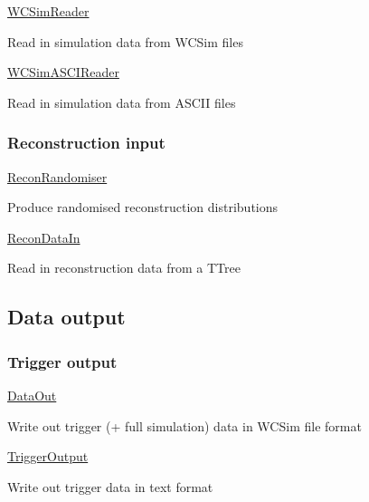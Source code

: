 \begin{DoxyItemize}
\item \hyperlink{classWCSimReader}{W\-C\-Sim\-Reader}
\begin{DoxyItemize}
\item Read in simulation data from W\-C\-Sim files
\end{DoxyItemize}
\item \hyperlink{classWCSimASCIReader}{W\-C\-Sim\-A\-S\-C\-I\-Reader}
\begin{DoxyItemize}
\item Read in simulation data from A\-S\-C\-I\-I files
\end{DoxyItemize}
\end{DoxyItemize}

\subsubsection*{Reconstruction input}


\begin{DoxyItemize}
\item \hyperlink{classReconRandomiser}{Recon\-Randomiser}
\begin{DoxyItemize}
\item Produce randomised reconstruction distributions
\end{DoxyItemize}
\item \hyperlink{classReconDataIn}{Recon\-Data\-In}
\begin{DoxyItemize}
\item Read in reconstruction data from a {\ttfamily T\-Tree}
\end{DoxyItemize}
\end{DoxyItemize}

\subsection*{Data output}

\subsubsection*{Trigger output}


\begin{DoxyItemize}
\item \hyperlink{classDataOut}{Data\-Out}
\begin{DoxyItemize}
\item Write out trigger (+ full simulation) data in W\-C\-Sim file format
\end{DoxyItemize}
\item \hyperlink{classTriggerOutput}{Trigger\-Output}
\begin{DoxyItemize}
\item Write out trigger data in text format
\end{DoxyItemize}
\end{DoxyItemize}

